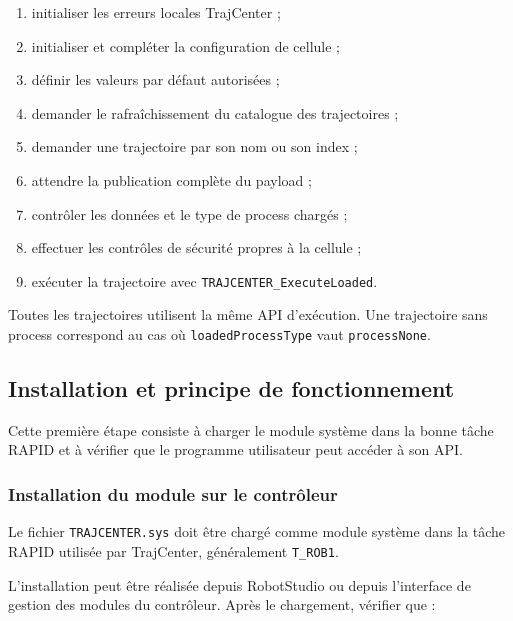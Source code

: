 \documentclass{rapportENSAM}
\begin{document}
\begin{enumerate}
    \item initialiser les erreurs locales TrajCenter ;
    \item initialiser et compléter la configuration de cellule ;
    \item définir les valeurs par défaut autorisées ;
    \item demander le rafraîchissement du catalogue des trajectoires ;
    \item demander une trajectoire par son nom ou son index ;
    \item attendre la publication complète du payload ;
    \item contrôler les données et le type de process chargés ;
    \item effectuer les contrôles de sécurité propres à la cellule ;
    \item exécuter la trajectoire avec
    \texttt{TRAJCENTER\_ExecuteLoaded}.
\end{enumerate}

Toutes les trajectoires utilisent la même API d'exécution. Une trajectoire sans
process correspond au cas où \texttt{loadedProcessType} vaut
\texttt{processNone}.


\subsection{Installation et principe de fonctionnement}
\label{subsec:rapid-installation-operation}

Cette première étape consiste à charger le module système dans la bonne tâche
RAPID et à vérifier que le programme utilisateur peut accéder à son API.


\subsubsection{Installation du module sur le contrôleur}
\label{subsubsec:rapid-module-installation}

Le fichier \texttt{TRAJCENTER.sys} doit être chargé comme module système dans
la tâche RAPID utilisée par TrajCenter, généralement \texttt{T\_ROB1}.

L'installation peut être réalisée depuis RobotStudio ou depuis l'interface de
gestion des modules du contrôleur. Après le chargement, vérifier que :
\end{document}
